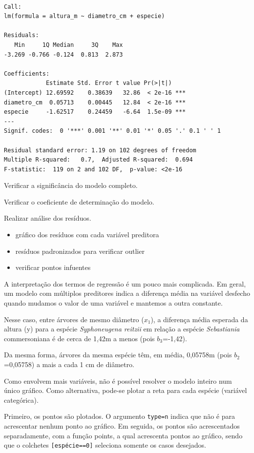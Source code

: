 \documentclass[12pt,brazil,oneside]{book}
\providecommand{\tightlist}{%
  \setlength{\itemsep}{0pt}\setlength{\parskip}{0pt}}
\begin{document}
\begin{verbatim}

Call:
lm(formula = altura_m ~ diametro_cm + especie)

Residuals:
   Min     1Q Median     3Q    Max 
-3.269 -0.766 -0.124  0.813  2.873 

Coefficients:
            Estimate Std. Error t value Pr(>|t|)    
(Intercept) 12.69592    0.38639   32.86  < 2e-16 ***
diametro_cm  0.05713    0.00445   12.84  < 2e-16 ***
especie     -1.62517    0.24459   -6.64  1.5e-09 ***
---
Signif. codes:  0 '***' 0.001 '**' 0.01 '*' 0.05 '.' 0.1 ' ' 1

Residual standard error: 1.19 on 102 degrees of freedom
Multiple R-squared:   0.7,  Adjusted R-squared:  0.694 
F-statistic:  119 on 2 and 102 DF,  p-value: <2e-16
\end{verbatim}

Verificar a significância do modelo completo.

Verificar o coeficiente de determinação do modelo.

Realizar análise dos resíduos.

\begin{itemize}
\tightlist
\item
  gráfico dos resíduos com cada variável preditora
\item
  resíduos padronizados para verificar outlier
\item
  verificar pontos infuentes
\end{itemize}

A interpretação dos termos de regressão é um pouco mais complicada. Em
geral, um modelo com múltiplos preditores indica a diferença média na
variável desfecho quando mudamos o valor de uma variável e mantemos a
outra constante.

Nesse caso, entre árvores de mesmo diâmetro (\(x_1\)), a diferença média
esperada da altura (y) para a espécie \emph{Syphoneugena reitzii} em
relação a espécie \emph{Sebastiania} commersoniana é de cerca de 1,42m a
menos (pois \(b_3\)=-1,42).

Da mesma forma, árvores da mesma espécie têm, em média, 0,05758m (pois
\(b_2\)=0,05758) a mais a cada 1 cm de diâmetro.

Como envolvem mais variáveis, não é possível resolver o modelo inteiro
num único gráfico. Como alternativa, pode-se plotar a reta para cada
espécie (variável categórica).

Primeiro, os pontos são plotados. O argumento
\texttt{type=\textquotesingle{}n\textquotesingle{}} indica que não é
para acrescentar nenhum ponto ao gráfico. Em seguida, os pontos são
acrescentados separadamente, com a função points, a qual acrescenta
pontos ao gráfico, sendo que o colchetes \texttt{{[}espécie==0{]}}
seleciona somente os casos desejados.
\end{document}
